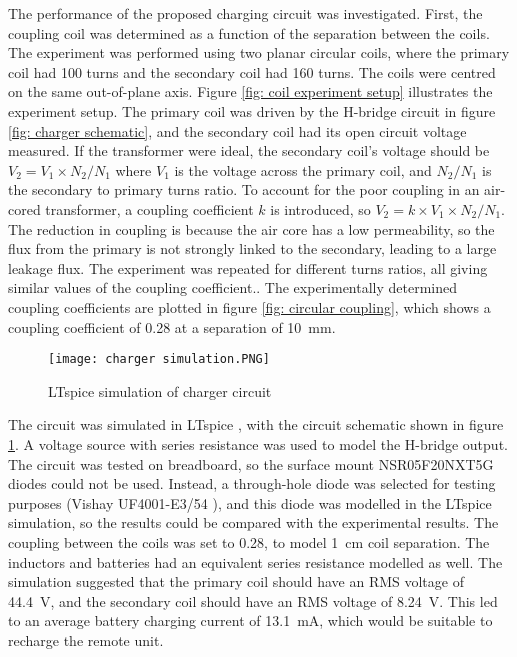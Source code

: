 The performance of the proposed charging circuit was investigated. First, the coupling coil was determined as a function of the separation between the coils. The experiment was performed using two planar circular coils, where the primary coil had 100 turns and the secondary coil had 160 turns. The coils were centred on the same out-of-plane axis. Figure \ref{fig: coil experiment setup} illustrates the experiment setup. The primary coil was driven by the H-bridge circuit in figure \ref{fig: charger schematic}, and the secondary coil had its open circuit voltage measured. If the transformer were ideal, the secondary coil's voltage should be $V_2 = V_1 \times N_2 / N_1$ where $V_1$ is the voltage across the primary coil, and $N_2 / N_1$ is the secondary to primary turns ratio. To account for the poor coupling in an air-cored transformer, a coupling coefficient $k$ is introduced, so $V_2 = k \times V_1 \times N_2 / N_1$. The reduction in coupling is because the air core has a low permeability, so the flux from the primary is not strongly linked to the secondary, leading to a large leakage flux. The experiment was repeated for different turns ratios, all giving similar values of the coupling coefficient.. The experimentally determined coupling coefficients are plotted in figure \ref{fig: circular coupling}, which shows a coupling coefficient of 0.28 at a separation of \SI{10}{\milli\metre}.\\


\begin{figure}[htbp]
	\centering
	\texttt{[image: charger simulation.PNG]}
	\caption{LTspice simulation of charger circuit}
	\label{fig: charger simulation}
\end{figure}

The circuit was simulated in LTspice \cite{ltspice}, with the circuit schematic shown in figure \ref{fig: charger simulation}. A voltage source with series resistance was used to model the H-bridge output. The circuit was tested on breadboard, so the surface mount NSR05F20NXT5G diodes could not be used. Instead, a through-hole diode was selected for testing purposes (Vishay UF4001-E3/54 \cite{tht_diode}), and this diode was modelled in the LTspice simulation, so the results could be compared with the experimental results. The coupling between the coils was set to 0.28, to model \SI{1}{cm} coil separation. The inductors and batteries had an equivalent series resistance modelled as well. The simulation suggested that the primary coil should have an RMS voltage of \SI{44.4}{\volt}, and the secondary coil should have an RMS voltage of \SI{8.24}{\volt}. This led to an average battery charging current of \SI{13.1}{\milli\ampere}, which would be suitable to recharge the remote unit. %

